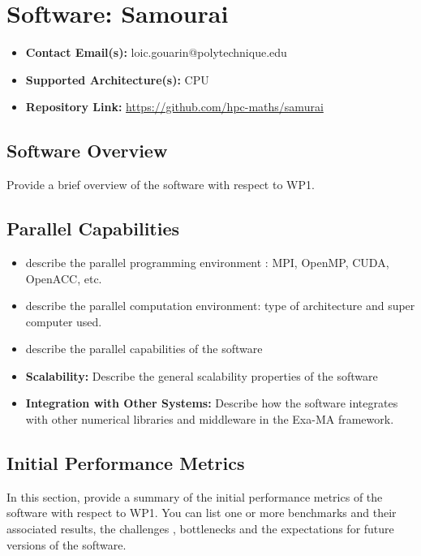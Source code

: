 \section{Software: Samourai}
\label{sec:WP1:Samourai:software}

\begin{itemize}
    \item \textbf{Contact Email(s):} loic.gouarin@polytechnique.edu
    \item \textbf{Supported Architecture(s):} CPU
    \item \textbf{Repository Link:} \href{https://github.com/hpc-maths/samurai}{https://github.com/hpc-maths/samurai}
\end{itemize}

\subsection{Software Overview}
\label{sec:WP1:Samourai:summary}

Provide a brief overview of the software with respect to WP1.

\subsection{Parallel Capabilities}
\label{sec:WP1:Samourai:performances}


\begin{itemize}
    \item describe the parallel programming  environment : MPI, OpenMP, CUDA, OpenACC, etc.
    \item describe the parallel computation environment: type of architecture and super computer used.
    \item describe the parallel capabilities of the software
    \item \textbf{Scalability:} Describe the general scalability properties of the software
    \item \textbf{Integration with Other Systems:} Describe how the software integrates with other numerical libraries and middleware in the Exa-MA framework.
\end{itemize}

\subsection{Initial Performance Metrics}
\label{sec:WP1:Samourai:metrics}

In this section, provide a summary of the initial performance metrics of the software with respect to WP1.
You can list one or more benchmarks and their associated results, the challenges , bottlenecks and the expectations for future versions of the software.



